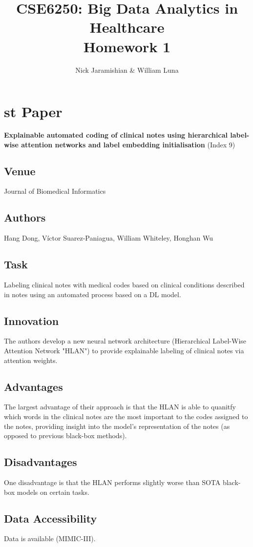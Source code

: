 \documentclass[12pt]{article}
\title{CSE6250: Big Data Analytics in Healthcare \\ Homework 1}
\author{Nick Jaramishian & William Luna}
\begin{document}
\maketitle

\section{st Paper}
\textbf{Explainable automated coding of clinical notes using hierarchical label-wise attention networks and label embedding initialisation} (Index 9)
\subsection{Venue}
Journal of Biomedical Informatics
\subsection{Authors}
Hang Dong, Víctor Suarez-Paniagua, William Whiteley, Honghan Wu 
\subsection{Task}
Labeling clinical notes with medical codes based on clinical conditions described in notes using an automated process based on a DL model.
\subsection{Innovation}
The authors develop a new neural network architecture (Hierarchical Label-Wise Attention Network "HLAN") to provide explainable labeling of clinical notes via attention weights. 
\subsection{Advantages}
The largest advantage of their approach is that the HLAN is able to quanitfy which words in the clinical notes are the most important to the codes assigned to the notes, providing insight into the model's representation of the notes (as opposed to previous black-box methods).
\subsection{Disadvantages}
One disadvantage is that the HLAN performs slightly worse than SOTA black-box models on certain tasks. 
\subsection{Data Accessibility}
 Data is available (MIMIC-III).
\end{document}
